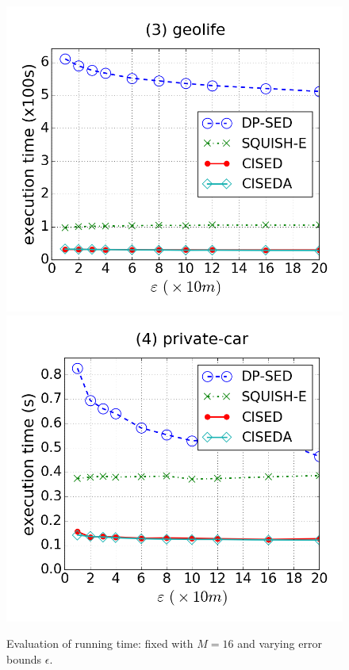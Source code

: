 \begin{figure}[tb!]
\includegraphics[scale = 0.250]{figures/Exp-time-epsilon-geolife.png}
\includegraphics[scale = 0.250]{figures/Exp-time-epsilon-private.png}
\vspace{-2ex}
\caption{\small Evaluation of running time: fixed with $M=16$ and varying error bounds $\epsilon$.}
\label{fig:time-epsilon}
\vspace{-2ex}
\end{figure}




